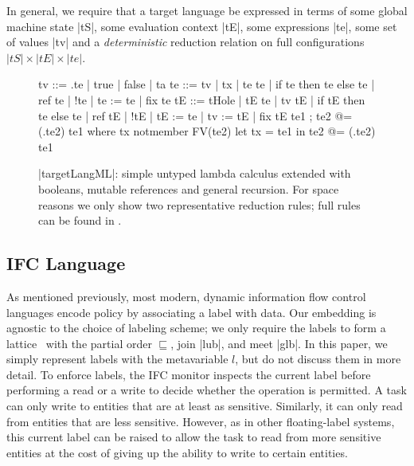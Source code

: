 In general, we require that a target language be expressed in terms
of some global machine state |tS|, some evaluation context |tE|,
some expressions |te|, some set of values |tv| and a \emph{deterministic}
reduction relation on full configurations $|tS| \times |tE| \times |te|$.

\begin{figure}
\begin{code}
tv   ::= \tx.te | true | false | ta
te   ::= tv | tx | te te | if te then te else te | ref te | !te | te := te | fix te
tE   ::= tHole | tE te | tv tE | if tE then te else te | ref tE | !tE | tE := te | tv := tE | fix tE
te1 ; te2            @= (\tx.te2) te1  where  tx notmember FV(te2)
let tx = te1 in te2  @= (\tx.te2) te1
\end{code}

\caption{|targetLangML|: simple untyped lambda calculus extended with booleans,
mutable references and general recursion.  For space reasons we only show two
representative reduction rules;  full rules can be found in .}
\label{fig:ml}
\end{figure}

\subsection{IFC Language}

As mentioned previously, most modern, dynamic information flow control
languages encode policy by associating a label with data.  Our
embedding is agnostic to the choice of labeling scheme; we only require
the labels to form a lattice~\cite{Denning:1976:LMS:360051.360056} with
the partial order $\sqsubseteq$, join |lub|, and meet |glb|.  In this
paper, we simply represent labels with the metavariable $l$, but do not
discuss them in more detail.
%
To enforce labels, the IFC monitor inspects the
current label  before performing a read or a write to decide whether the operation is permitted.
%
A task can only write to entities that are at least as sensitive.
%
Similarly, it can only read from entities that are less sensitive.
%
However, as in other floating-label systems, this current label can be raised
to allow the task to read from more sensitive entities at the cost of giving up
the ability to write to certain entities.

